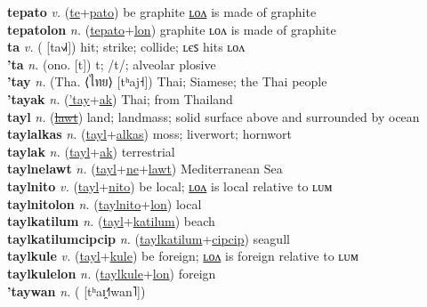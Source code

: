 \textbf{tepato} \textit{v.} (\hyperref[te]{te}+\hyperref[pato]{pato})
be graphite \hyperref[tepatolon]{ʟᴏᴧ} is made of graphite \label{tepato} \\
\textbf{tepatolon} \textit{n.} (\hyperref[tepato]{tepato}+\hyperref[lon]{lon})
graphite ʟᴏᴧ is made of graphite \label{tepatolon} \\
\textbf{ta} \textit{v.} ( [ta˧˩˧])
hit; strike; collide; ʟєꜱ hits ʟᴏᴧ \label{ta} \\
\textbf{'ta} \textit{n.} (ono. [t])
t; /t/; alveolar plosive \label{'ta} \\
\textbf{'tay} \textit{n.} (Tha. ⟨ไทย⟩ [tʰaj˧])
Thai; Siamese; the Thai people \label{'tay} \\
\textbf{'tayak} \textit{n.} (\hyperref['tay]{'tay}+\hyperref[ak]{ak})
Thai; from Thailand \label{'tayak} \\
\textbf{tayl} \textit{n.} (\hyperref[lawt]{\sout{lawt}})
land; landmass; solid surface above and surrounded by ocean \label{tayl} \\
\textbf{taylalkas} \textit{n.} (\hyperref[tayl]{tayl}+\hyperref[alkas]{alkas})
moss; liverwort; hornwort \label{taylalkas} \\
\textbf{taylak} \textit{n.} (\hyperref[tayl]{tayl}+\hyperref[ak]{ak})
terrestrial \label{taylak} \\
\textbf{taylnelawt} \textit{n.} (\hyperref[tayl]{tayl}+\hyperref[ne]{ne}+\hyperref[lawt]{lawt})
Mediterranean Sea \label{taylnelawt} \\
\textbf{taylnito} \textit{v.} (\hyperref[tayl]{tayl}+\hyperref[nito]{nito})
be local; \hyperref[taylnitolon]{ʟᴏᴧ} is local relative to ʟᴜᴍ \label{taylnito} \\
\textbf{taylnitolon} \textit{n.} (\hyperref[taylnito]{taylnito}+\hyperref[lon]{lon})
local \label{taylnitolon} \\
\textbf{taylkatilum} \textit{n.} (\hyperref[tayl]{tayl}+\hyperref[katilum]{katilum})
beach \label{taylkatilum} \\
\textbf{taylkatilumcipcip} \textit{n.} (\hyperref[taylkatilum]{taylkatilum}+\hyperref[cipcip]{cipcip})
seagull \label{taylkatilumcipcip} \\
\textbf{taylkule} \textit{v.} (\hyperref[tayl]{tayl}+\hyperref[kule]{kule})
be foreign; \hyperref[taylkulelon]{ʟᴏᴧ} is foreign relative to ʟᴜᴍ \label{taylkule} \\
\textbf{taylkulelon} \textit{n.} (\hyperref[taylkule]{taylkule}+\hyperref[lon]{lon})
foreign \label{taylkulelon} \\
\textbf{'taywan} \textit{n.} ( [tʰaɪ̯˧˥wan˥])
